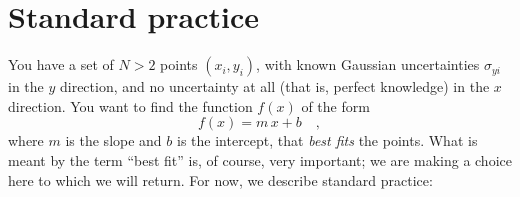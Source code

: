 \documentclass[12pt,twoside]{article}
\begin{document}
\section{Standard practice}\label{sec:standard}

You have a set of $N>2$ points $(x_i,y_i)$, with known Gaussian
uncertainties $\sigma_{yi}$ in the $y$ direction, and no uncertainty
at all (that is, perfect knowledge) in the $x$ direction.  You want to
find the function $f(x)$ of the form
\begin{equation}\label{eq:fofx}
f(x) = m\,x + b \quad ,
\end{equation}
where $m$ is the slope and $b$ is the intercept, that \emph{best fits}
the points.  What is meant by the term ``best fit'' is, of course,
very important; we are making a choice here to which we will return.
For now, we describe standard practice:
\end{document}
